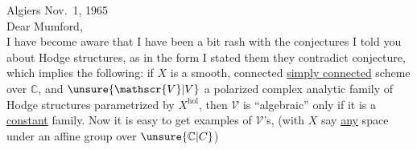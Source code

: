 Algiers Nov.~1, 1965\\
Dear Mumford,\\

I have become aware that I have been a bit rash with the conjectures I told you about Hodge structures, as in the form I stated them they contradict  conjecture, which implies the following: if $X$ is a smooth, connected \uline{simply connected} scheme over $\mathbb{C}$, and $\unsure{\mathscr{V}|V}$ a polarized complex analytic family of Hodge structures parametrized by $X^{\mathrm{hol}}$, then $\mathscr{V}$ is ``algebraic'' only if it is a \uline{constant} family. Now it is easy to get examples of $\mathscr{V}$'s, (with $X$ say \uline{any}  space under an affine group over $\unsure{\mathbb{C}|C}$)

